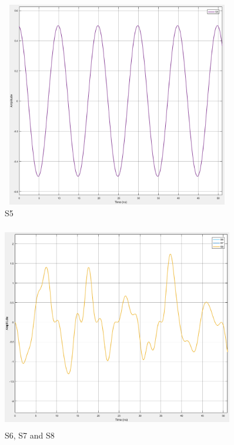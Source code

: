 \begin{figure}[h]
	\centering
	\includegraphics[width=0.9\textwidth, height=9cm]{./sdf/simplified_coherent_receiver/figures/S5.png}
	\caption{S5}\label{}
\end{figure}

\begin{figure}[h]
	\centering
	\includegraphics[width=0.9\textwidth, height=9cm]{./sdf/simplified_coherent_receiver/figures/S6S7S8.png}
	\caption{S6, S7 and S8}\label{}
\end{figure}

